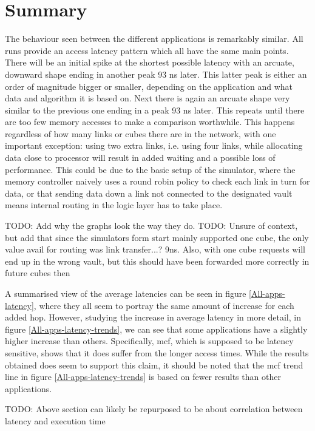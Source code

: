 \section{Summary}
The behaviour seen between the different applications is remarkably similar. All runs provide an access latency pattern which all have the same main points. There will be an initial spike at the shortest possible latency with an arcuate, downward shape ending in another peak 93 ns later. This latter peak is either an order of magnitude bigger or smaller, depending on the application and what data and algorithm it is based on. Next there is again an arcuate shape very similar to the previous one ending in a peak 93 ns later. This repeats until there are too few memory accesses to make a comparison worthwhile. This happens regardless of how many links or cubes there are in the network, with one important exception: using two extra links, i.e. using four links, while allocating data close to processor will result in added waiting and a possible loss of performance. This could be due to the basic setup of the simulator, where the memory controller naively uses a round robin policy to check each link in turn for data, or that sending data down a link not connected to the designated vault means internal routing in the logic layer has to take place.
\bigskip

TODO: Add why the graphs look the way they do.
TODO: Unsure of context, but add that since the simulators form start mainly supported one cube, the only value avail for routing was link transfer...? 9ns. Also, with one cube requests will end up in the wrong vault, but this should have been forwarded more correctly in future cubes then

A summarised view of the average latencies can be seen in figure \ref{All-apps-latency}, where they all seem to portray the same amount of increase for each added hop. However, studying the increase in average latency in more detail, in figure \ref{All-apps-latency-trends}, we can see that some applications have a slightly higher increase than others. Specifically, mcf, which is supposed to be latency sensitive, shows that it does suffer from the longer access times. While the results obtained does seem to support this claim, it should be noted that the mcf trend line in figure \ref{All-apps-latency-trends} is based on fewer results than other applications.
\bigskip

TODO: Above section can likely be repurposed to be about correlation between latency and execution time

